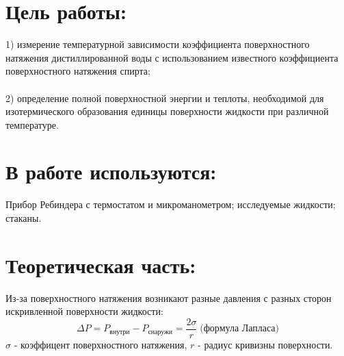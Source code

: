 \documentclass[a4paper,12pt]{article}
\begin{document}

\tableofcontents
\listoffigures
\listoftables

\newpage

\large
\section{Цель работы:}
1) измерение температурной зависимости  коэффициента поверхностного натяжения дистиллированной воды с использованием известного коэффициента поверхностного натяжения спирта;
\\\\2) определение полной поверхностной энергии  и теплоты, необходимой для изотермического образования единицы  поверхности жидкости  при различной температуре.

\section{В работе используются:}
Прибор  Ребиндера  с термостатом и микроманометром; исследуемые жидкости; стаканы.

\section{Теоретическая часть:}
Из-за поверхностного натяжения возникают разные давления с разных сторон искривленной поверхности жидкости:
\begin{equation}
    \Delta P = P_\text{внутри} - P_\text{снаружи} = \frac{2\sigma}{r} \;\text{(формула Лапласа)}
\end{equation}
$\sigma$ - коэффицент поверхностного натяжения, $r$ - радиус кривизны поверхности.
\end{document}
